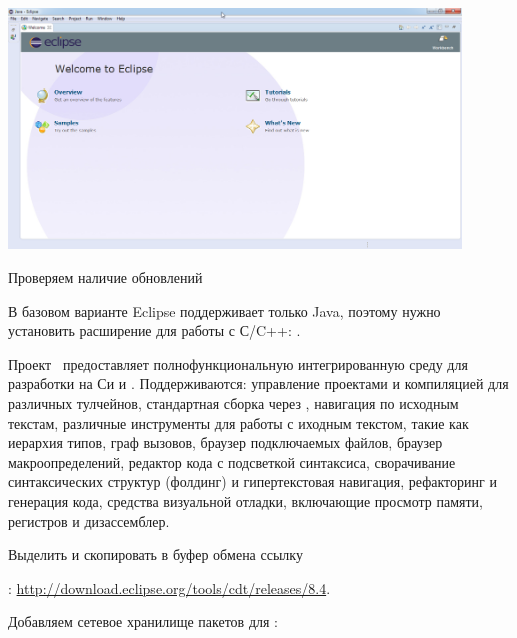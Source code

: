 \bigskip{}

\bigskip\includegraphics[width=0.9\textwidth]{eclipse/EclipseMain.png}

\bigskip Проверяем наличие обновлений

\bigskip{}

\bigskip В базовом варианте Eclipse поддерживает только Java, поэтому нужно
установить расширение для работы с С/C++: .

\bigskip
Проект \ предоставляет полнофункциональную интегрированную среду
для разработки на Си и \cpp. Поддерживаются: управление проектами и
компиляцией для различных тулчейнов, стандартная сборка через
, навигация по исходным текстам, различные инструменты для
работы с иходным текстом, такие как иерархия типов, граф вызовов, браузер
подключаемых файлов, браузер макроопределений, редактор кода с подсветкой
синтаксиса, сворачивание синтаксических структур (фолдинг) и гипертекстовая
навигация, рефакторинг и генерация кода, средства визуальной отладки,
включающие просмотр памяти, регистров и дизассемблер.

\bigskip{}

\bigskip Выделить и скопировать в буфер обмена ссылку

:
\url{http://download.eclipse.org/tools/cdt/releases/8.4}.

\bigskip Добавляем сетевое хранилище пакетов для \eclipse:

\bigskip{}

\bigskip{}


